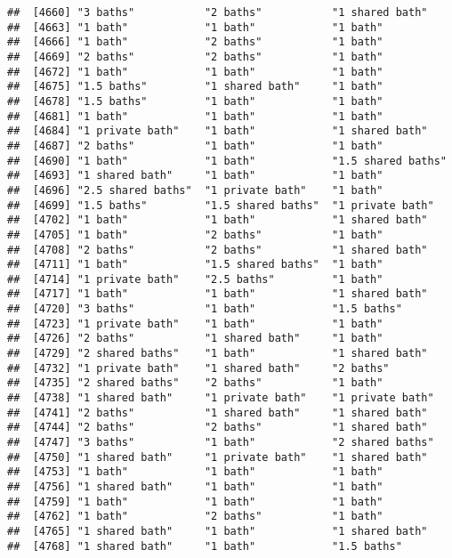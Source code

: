 \documentclass[
]{article}
\begin{document}
\begin{verbatim}
##  [4660] "3 baths"           "2 baths"           "1 shared bath"    
##  [4663] "1 bath"            "1 bath"            "1 bath"           
##  [4666] "1 bath"            "2 baths"           "1 bath"           
##  [4669] "2 baths"           "2 baths"           "1 bath"           
##  [4672] "1 bath"            "1 bath"            "1 bath"           
##  [4675] "1.5 baths"         "1 shared bath"     "1 bath"           
##  [4678] "1.5 baths"         "1 bath"            "1 bath"           
##  [4681] "1 bath"            "1 bath"            "1 bath"           
##  [4684] "1 private bath"    "1 bath"            "1 shared bath"    
##  [4687] "2 baths"           "1 bath"            "1 bath"           
##  [4690] "1 bath"            "1 bath"            "1.5 shared baths" 
##  [4693] "1 shared bath"     "1 bath"            "1 bath"           
##  [4696] "2.5 shared baths"  "1 private bath"    "1 bath"           
##  [4699] "1.5 baths"         "1.5 shared baths"  "1 private bath"   
##  [4702] "1 bath"            "1 bath"            "1 shared bath"    
##  [4705] "1 bath"            "2 baths"           "1 bath"           
##  [4708] "2 baths"           "2 baths"           "1 shared bath"    
##  [4711] "1 bath"            "1.5 shared baths"  "1 bath"           
##  [4714] "1 private bath"    "2.5 baths"         "1 bath"           
##  [4717] "1 bath"            "1 bath"            "1 shared bath"    
##  [4720] "3 baths"           "1 bath"            "1.5 baths"        
##  [4723] "1 private bath"    "1 bath"            "1 bath"           
##  [4726] "2 baths"           "1 shared bath"     "1 bath"           
##  [4729] "2 shared baths"    "1 bath"            "1 shared bath"    
##  [4732] "1 private bath"    "1 shared bath"     "2 baths"          
##  [4735] "2 shared baths"    "2 baths"           "1 bath"           
##  [4738] "1 shared bath"     "1 private bath"    "1 private bath"   
##  [4741] "2 baths"           "1 shared bath"     "1 shared bath"    
##  [4744] "2 baths"           "2 baths"           "1 shared bath"    
##  [4747] "3 baths"           "1 bath"            "2 shared baths"   
##  [4750] "1 shared bath"     "1 private bath"    "1 shared bath"    
##  [4753] "1 bath"            "1 bath"            "1 bath"           
##  [4756] "1 shared bath"     "1 bath"            "1 bath"           
##  [4759] "1 bath"            "1 bath"            "1 bath"           
##  [4762] "1 bath"            "2 baths"           "1 bath"           
##  [4765] "1 shared bath"     "1 bath"            "1 shared bath"    
##  [4768] "1 shared bath"     "1 bath"            "1.5 baths"        

\end{verbatim}
\end{document}
